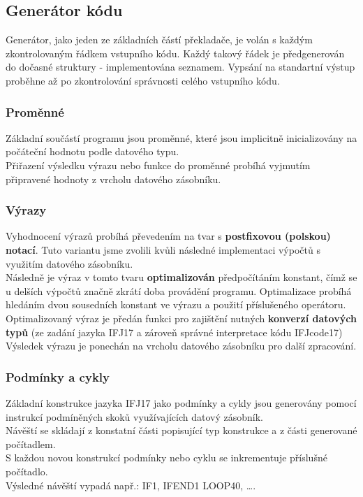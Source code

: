 \documentclass[11pt, a4paper]{article}
\begin{document}
	\subsection{Generátor kódu}
Generátor, jako jeden ze základních částí překladače, je volán s každým zkontrolovaným řádkem vstupního kódu. Každý takový řádek je předgenerován do dočasné struktury - implementována seznamem. Vypsání na standartní výstup proběhne až po zkontrolování správnosti celého vstupního kódu.
    \subsubsection{Proměnné}
    Základní součástí programu jsou proměnné, které jsou implicitně inicializovány na počáteční hodnotu podle datového typu.\\
    \indent Přiřazení výsledku výrazu nebo funkce do proměnné probíhá vyjmutím připravené hodnoty z vrcholu datového zásobníku.
	\subsubsection{Výrazy}
    Vyhodnocení výrazů probíhá převedením na tvar s {\bf postfixovou (polskou) notací}. Tuto variantu jsme zvolili kvůli následné implementaci výpočtů s využitím datového zásobníku.\\
    \indent Následně je výraz v tomto tvaru {\bf optimalizován} předpočítáním konstant, čímž se u delších výpočtů značně zkrátí doba provádění programu. Optimalizace probíhá hledáním dvou sousedních konstant ve výrazu a použití příslušeného operátoru.\\
    \indent Optimalizovaný výraz je předán funkci pro zajištění nutných {\bf konverzí datových typů} (ze zadání jazyka IFJ17 a zároveň správné interpretace kódu IFJcode17)\\
    Výsledek výrazu je ponechán na vrcholu datového zásobníku pro další zpracování.
    \subsubsection{Podmínky a cykly}
    Základní konstrukce jazyka IFJ17 jako podmínky a cykly jsou generovány pomocí instrukcí podmíněných skoků využívajících datový zásobník.\\
    \indent Návěští se skládají z konstatní části popisující typ konstrukce a z části generované počítadlem.\\S každou novou konstrukcí podmínky nebo cyklu se inkrementuje příslušné počítadlo.\\Výsledné návěští vypadá např.: IF1, IFEND1 LOOP40, \ldots .
\end{document}

